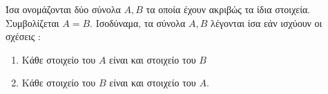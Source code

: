 Ίσα ονομάζονται δύο σύνολα $ A,B $ τα οποία έχουν ακριβώς τα ίδια στοιχεία. Συμβολίζεται $ A=B $. Ισοδύναμα, τα σύνολα $ Α,Β $ λέγονται ίσα εάν ισχύουν οι σχέσεις :
\begin{enumerate}[itemsep=0mm]
\item Κάθε στοιχείο του $ A $ είναι και στοιχείο του $ B $
\item Κάθε στοιχείο του $ B $ είναι και στοιχείο του $ A $.
\end{enumerate}
